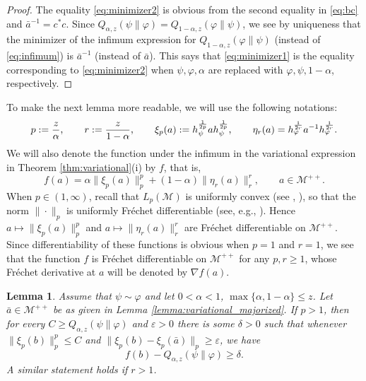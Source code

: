 \documentclass[12pt]{article}
\newtheorem{lemma}[theorem]{Lemma}
\theoremstyle{definition}
\theoremstyle{remark}
\numberwithin{equation}{section}
\def\Me{\mathcal M}
\def\ffi{\varphi}
\def\eps{\varepsilon}
\begin{document}
\begin{proof}
The equality  \eqref{eq:minimizer2} is obvious from the second equality in \eqref{eq:bc} and
$\bar a^{-1}=c^*c$. Since $Q_{\alpha,z}(\psi\|\ffi)=Q_{1-\alpha,z}(\ffi\|\psi)$, we see by uniqueness that
the minimizer of the infimum expression for $Q_{1-\alpha,z}(\ffi\|\psi)$ (instead of \eqref{eq:infimum}) is
$\bar a^{-1}$ (instead of $\bar a$). This says that \eqref{eq:minimizer1} is the equality corresponding to
\eqref{eq:minimizer2} when $\psi,\ffi,\alpha$ are replaced with $\ffi,\psi,1-\alpha$, respectively. 
\end{proof}

To make the next lemma more readable, we will use the following notations:
\[
p:={z\over\alpha},\qquad r:={z\over 1-\alpha},\qquad
\xi_p(a):=h_\psi^{1\over2p}ah_\psi^{1\over 2p},\qquad
\eta_r(a)=h_\ffi^{1\over2r}a^{-1}h_\ffi^{1\over 2r}.
\]
We will also denote the function under the infimum in the variational expression in
Theorem \ref{thm:variational}(i) by $f$, that is,
\begin{equation}\label{func-variational}
f(a)=\alpha\|\xi_p(a)\|_p^p
+(1-\alpha)\|\eta_r(a)\|_r^r,\qquad a\in \Me^{++}.
\end{equation}
{\color{red}When $p\in(1,\infty)$, recall that $L_p(\Me)$ is uniformly convex (see
\cite{haagerup1979lpspaces}, \cite[Theorem 4.2]{kosaki1984applications}), so that the norm
$\|\cdot\|_p$ is uniformly Fr\'echet differentiable (see, e.g.,
\cite[Part 3, Chap.~II]{beauzamy1982introduction}). Hence $a\mapsto\|\xi_p(a)\|_p^p$
and $a\mapsto\|\eta_r(a)\|_r^r$ are Fr\'echet differentiable on $\Me^{++}$. Since differentiability of
these functions is obvious when $p=1$ and $r=1$, we see that the function $f$ is Fr\'echet differentiable
on $\Me^{++}$ for any $p,r\ge1$, whose Fr\'echet derivative at $a$ will be denoted by $\nabla f(a)$.}

\begin{lemma}\label{lemma:variational_majorized2}
Assume that $\psi\sim\ffi$  and let $0<\alpha<1$, $\max\{\alpha,1-\alpha\}\le z$. {\color{red}Let
$\bar a\in\Me^{++}$ be as given in Lemma \ref{lemma:variational_majorized}.} If $p>1$, then for
every $C\ge Q_{\alpha,z}(\psi\|\ffi)$ and $\eps>0$ there is some $\delta>0$ such that whenever
$\|\xi_p(b)\|^p_p\le C$ and $\|\xi_p(b)-\xi_p(\bar a)\|_p\ge \eps$, we have
\[
f(b)-Q_{\alpha,z}(\psi\|\ffi)\ge \delta.
\]
A similar statement holds if $r>1$.
\end{lemma}
\end{document}
